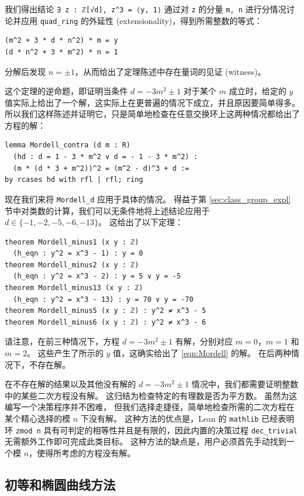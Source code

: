 \documentclass[sigplan,10pt,nonacm,
screen]{acmart} \settopmatter{printfolios=true,printccs=false,printacmref=false}
\newcommand{\mathlib}{\lstinline{mathlib}\xspace}
\begin{document}
我们得出结论
\lstinline{∃ z : ℤ[√d], z^3 = ⟨y, 1⟩}
通过对 \lstinline{z} 的分量 \lstinline{m, n} 进行分情况讨论并应用 \lstinline{quad_ring} 的外延性 (extensionality)，得到所需整数的等式：
\begin{lstlisting}
(m^2 + 3 * d * n^2) * m = y
(d * n^2 + 3 * m^2) * n = 1
\end{lstlisting}
分解后发现 $n = \pm 1$，从而给出了定理陈述中存在量词的见证 (witness)。

这个定理的逆命题，即证明当条件 $d = -3m^2 \pm 1$ 对于某个 $m$ 成立时，给定的 $y$ 值实际上给出了一个解，这实际上在更普遍的情况下成立，并且原因要简单得多。
所以我们这样陈述并证明它，只是简单地检查在任意交换环上这两种情况都给出了方程的解：
\begin{lstlisting}
lemma Mordell_contra (d m : R)
  (hd : d = 1 - 3 * m^2 ∨ d = - 1 - 3 * m^2) :
  (m * (d * 3 + m^2))^2 = (m^2 - d)^3 + d :=
by rcases hd with rfl | rfl; ring
\end{lstlisting}

现在我们来将 \lstinline{Mordell_d} 应用于具体的情况。
得益于第 \ref{sec:class_group_expl} 节中对类数的计算，我们可以无条件地将上述结论应用于 $d \in \{-1,-2,-5,-6,-13\}$。
这给出了以下定理：
\begin{lstlisting}
theorem Mordell_minus1 (x y : ℤ)
  (h_eqn : y^2 = x^3 - 1) : y = 0
theorem Mordell_minus2 (x y : ℤ)
  (h_eqn : y^2 = x^3 - 2) : y = 5 ∨ y = -5
theorem Mordell_minus13 (x y : ℤ)
  (h_eqn : y^2 = x^3 - 13) : y = 70 ∨ y = -70
theorem Mordell_minus5 (x y : ℤ) : y^2 ≠ x^3 - 5
theorem Mordell_minus6 (x y : ℤ) : y^2 ≠ x^3 - 6

\end{lstlisting}

请注意，在前三种情况下，方程 $d = - 3m^2 \pm 1$ 有解，分别对应 $m=0$，$m = 1$ 和 $m=2$。
这些产生了所示的 $y$ 值，这确实给出了 \ref{eqn:Mordell} 的解。
在后两种情况下，不存在解。

在不存在解的结果以及其他没有解的 $d = - 3m^2 \pm 1$ 情况中，我们都需要证明整数中的某些二次方程没有解。
这归结为检查特定的有理数是否为平方数。
虽然为这编写一个决策程序并不困难，
但我们选择走捷径，简单地检查所需的二次方程在某个精心选择的模 $n$ 下没有解。
这种方法的优点是，Lean 的 \mathlib 已经表明环 \lstinline{zmod n} 具有可判定的相等性并且是有限的，因此内置的决策过程 \lstinline{dec_trivial} 无需额外工作即可完成此类目标。
这种方法的缺点是，用户必须首先手动找到一个模 $n$，使得所考虑的方程没有解。

\subsection{初等和椭圆曲线方法}
\end{document}
